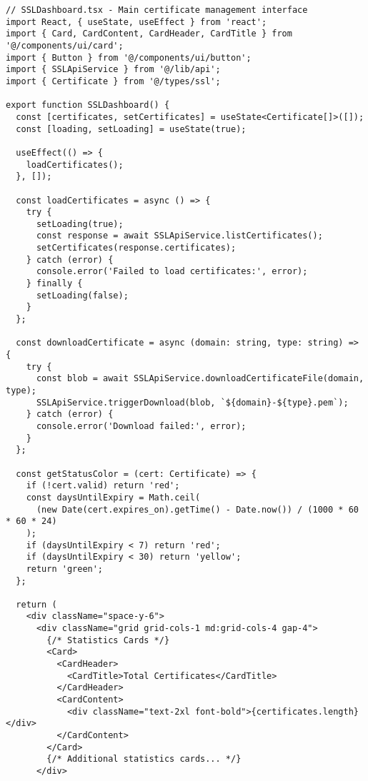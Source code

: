 \begin{verbatim}
// SSLDashboard.tsx - Main certificate management interface
import React, { useState, useEffect } from 'react';
import { Card, CardContent, CardHeader, CardTitle } from '@/components/ui/card';
import { Button } from '@/components/ui/button';
import { SSLApiService } from '@/lib/api';
import { Certificate } from '@/types/ssl';

export function SSLDashboard() {
  const [certificates, setCertificates] = useState<Certificate[]>([]);
  const [loading, setLoading] = useState(true);

  useEffect(() => {
    loadCertificates();
  }, []);

  const loadCertificates = async () => {
    try {
      setLoading(true);
      const response = await SSLApiService.listCertificates();
      setCertificates(response.certificates);
    } catch (error) {
      console.error('Failed to load certificates:', error);
    } finally {
      setLoading(false);
    }
  };

  const downloadCertificate = async (domain: string, type: string) => {
    try {
      const blob = await SSLApiService.downloadCertificateFile(domain, type);
      SSLApiService.triggerDownload(blob, `${domain}-${type}.pem`);
    } catch (error) {
      console.error('Download failed:', error);
    }
  };

  const getStatusColor = (cert: Certificate) => {
    if (!cert.valid) return 'red';
    const daysUntilExpiry = Math.ceil(
      (new Date(cert.expires_on).getTime() - Date.now()) / (1000 * 60 * 60 * 24)
    );
    if (daysUntilExpiry < 7) return 'red';
    if (daysUntilExpiry < 30) return 'yellow';
    return 'green';
  };

  return (
    <div className="space-y-6">
      <div className="grid grid-cols-1 md:grid-cols-4 gap-4">
        {/* Statistics Cards */}
        <Card>
          <CardHeader>
            <CardTitle>Total Certificates</CardTitle>
          </CardHeader>
          <CardContent>
            <div className="text-2xl font-bold">{certificates.length}</div>
          </CardContent>
        </Card>
        {/* Additional statistics cards... */}
      </div>
      

\end{verbatim}

